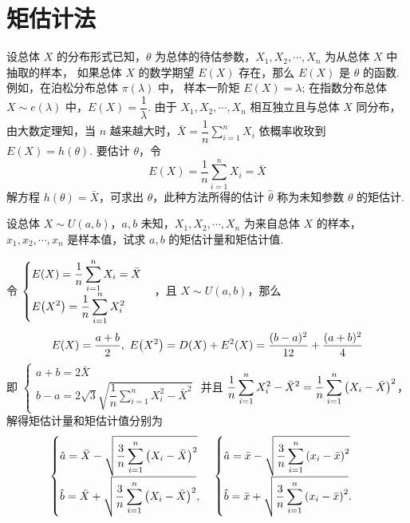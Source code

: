 \section{矩估计法}

设总体 $ X $ 的分布形式已知，$\theta $ 为总体的待估参数，$X_{1}, X_{2}, \cdots, X_{n} $ 为从总体 $ X $ 中抽取的样本，
如果总体 $ X $ 的数学期望 $ E(X) $ 存在，那么 $ E(X) $ 是 $ \theta $ 的函数. 例如，在泊松分布总体 $ \pi(\lambda) $ 中，
样本一阶矩 $ E(X)=\lambda$; 在指数分布总体 $ X \sim e(\lambda) $ 中，$E(X)=\dfrac{1}{\lambda}$.
由于 $ X_{1}, X_{2}, \cdots, X_{n} $ 相互独立且与总体 $ X $ 同分布，由大数定理知，当 $ n $ 越来越大时，$\displaystyle\bar{X}=\dfrac{1}{n} \sum_{i=1}^{n} X_{i} $
依概率收玫到 $ E(X)=h(\theta) .$
要估计 $ \theta $，令
$$E(X)=\frac{1}{n} \sum_{i=1}^{n} X_{i}=\bar{X}$$
解方程 $h(\theta)=\bar{X}$，可求出 $ \theta$，此种方法所得的估计 $ \hat{\theta} $ 称为未知参数 $ \theta $ 的矩估计.

\begin{example}
    设总体 $ X \sim U(a, b)$，$ a, b $ 未知，$X_{1}, X_{2}, \cdots, X_{n} $ 为来自总体 $ X $ 的样本，$  x_{1} ,  x_{2}, \cdots, x_{n} $ 是样本值，试求 $ a, b $ 的矩估计量和矩估计值.
\end{example}
\begin{solution}
    令 $\begin{cases}
            \displaystyle E(X)=\dfrac{1}{n}\sum_{i=1}^{n}X_i=\bar{X} \\
            \displaystyle E\qty(X^2)=\dfrac{1}{n}\sum_{i=1}^{n}X_i^2
        \end{cases}$，且 $X\sim U(a,b)$，那么
    $$E(X)=\dfrac{a+b}{2},~E\qty(X^2)=D(X)+E^2(X)=\dfrac{(b-a)^2}{12}+\dfrac{(a+b)^2}{4}$$
    即 $\begin{cases}
            a+b =2\bar{X} \\
            \displaystyle b-a=2\sqrt{3}\sqrt{\dfrac{1}{n}\sum_{i=1}^{n}X_i^2-\bar{X}^2}
        \end{cases}$ 并且 $\displaystyle\dfrac{1}{n}\sum_{i=1}^{n}X_i^2-\bar{X}^2=\dfrac{1}{n}\sum_{i=1}^{n}\qty(X_i-\bar{X})^2$，
    解得矩估计量和矩估计值分别为
    $$\begin{cases}
            \displaystyle \hat{a}=\bar{X}-\sqrt{\dfrac{3}{n}\sum_{i=1}^{n}\qty(X_i-\bar{X})^2} \\
            \displaystyle \hat{b}=\bar{X}+\sqrt{\dfrac{3}{n}\sum_{i=1}^{n}\qty(X_i-\bar{X})^2},
        \end{cases}
        \begin{cases}
            \displaystyle \hat{a}=\bar{x}-\sqrt{\dfrac{3}{n}\sum_{i=1}^{n}\qty(x_i-\bar{x})^2} \\
            \displaystyle \hat{b}=\bar{x}+\sqrt{\dfrac{3}{n}\sum_{i=1}^{n}\qty(x_i-\bar{x})^2}.
        \end{cases}$$
\end{solution}

